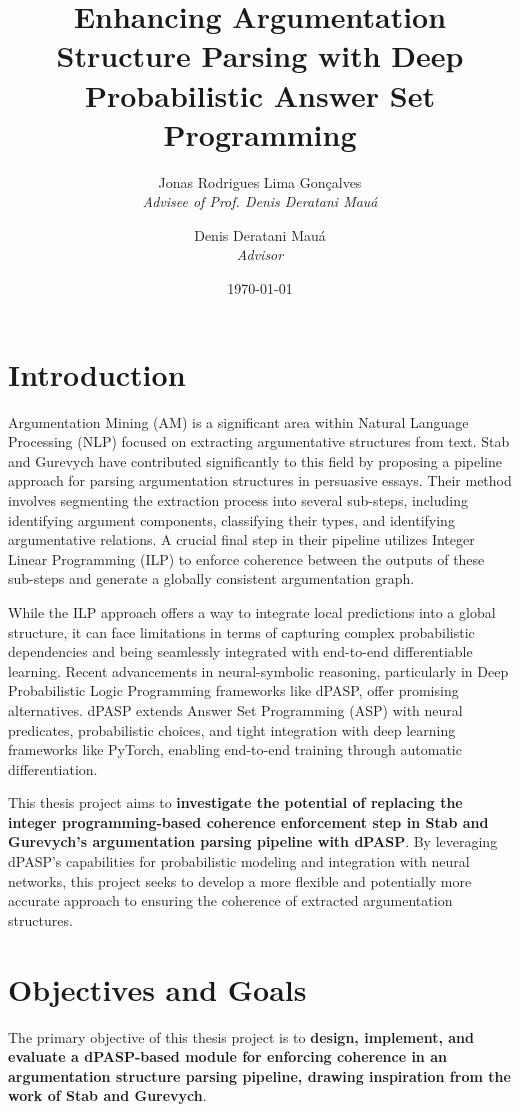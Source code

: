 \documentclass{article}
\title{Enhancing Argumentation Structure Parsing with Deep Probabilistic Answer
Set Programming}
\author{Jonas Rodrigues Lima Gonçalves \\ \textit{Advisee of Prof. Denis 
Deratani Mauá} \and Denis Deratani Mauá \\ \textit{Advisor}}
\date{\today}
\begin{document}
\maketitle

\section{Introduction}

Argumentation Mining (AM) is a significant area within Natural Language
Processing (NLP) focused on extracting argumentative structures from text. Stab
and Gurevych have contributed significantly to this field by proposing a
pipeline approach for parsing argumentation structures in persuasive essays.
Their method involves segmenting the extraction process into several sub-steps,
including identifying argument components, classifying their types, and
identifying argumentative relations. A crucial final step in their pipeline
utilizes Integer Linear Programming (ILP) to enforce coherence between the
outputs of these sub-steps and generate a globally consistent argumentation
graph.

While the ILP approach offers a way to integrate local predictions into a global
structure, it can face limitations in terms of capturing complex probabilistic
dependencies and being seamlessly integrated with end-to-end differentiable
learning. Recent advancements in neural-symbolic reasoning, particularly in
Deep Probabilistic Logic Programming frameworks like dPASP, offer promising
alternatives. dPASP extends Answer Set Programming (ASP) with neural
predicates, probabilistic choices, and tight integration with deep learning
frameworks like PyTorch, enabling end-to-end training through automatic
differentiation.

This thesis project aims to \textbf{investigate the potential of replacing the
integer programming-based coherence enforcement step in Stab and Gurevych's
argumentation parsing pipeline with dPASP}. By leveraging dPASP's capabilities
for probabilistic modeling and integration with neural networks, this project
seeks to develop a more flexible and potentially more accurate approach to
ensuring the coherence of extracted argumentation structures.

\section{Objectives and Goals}

The primary objective of this thesis project is to \textbf{design, implement,
and evaluate a dPASP-based module for enforcing coherence in an argumentation
structure parsing pipeline, drawing inspiration from the work of Stab and
Gurevych}.
\end{document}
